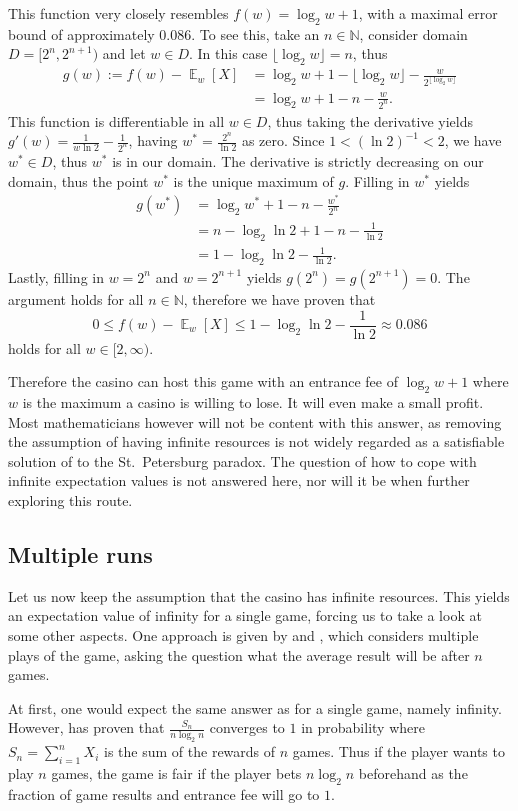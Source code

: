 \documentclass[twoside,a4paper]{article}
\theoremstyle{plain}
\theoremstyle{definition}
\theoremstyle{remark}
\numberwithin{equation}{section}
\newcommand{\N}{\mathbb{N}}
\DeclareMathOperator{\E}{\mathbb{E}}
\DeclareMathOperator{\1}{\mathbbm{1}}
\begin{document}
This function very closely resembles $f(w)=\log_2 w+1$, with a maximal error bound of approximately $0.086$. To see this, take an $n\in\N$, consider domain $D=[2^n,2^{n+1})$ and let $w\in D$. In this case $\lfloor\log_2 w\rfloor=n$, thus
\begin{align*}
g(w):=f(w)-\E_w[X]&=\log_2 w+1-\lfloor\log_2 w\rfloor-\frac{w}{2^{\lfloor\log_2 w\rfloor}}\\
&=\log_2 w+1-n-\frac{w}{2^n}.
\end{align*}
This function is differentiable in all $w\in D$, thus taking the derivative yields $g'(w)=\frac{1}{w\ln2}-\frac{1}{2^n}$, having $w^*=\frac{2^n}{\ln2}$ as zero. Since $1<(\ln2)^{-1}<2$, we have $w^*\in D$, thus $w^*$ is in our domain. The derivative is strictly decreasing on our domain, thus the point $w^*$ is the unique maximum of $g$. Filling in $w^*$ yields
\begin{align*}
g(w^*)&=\log_2 w^*+1-n-\frac{w^*}{2^n}\\
&=n-\log_2\ln 2+1-n-\frac{1}{\ln2}\\
&=1-\log_2\ln2-\frac{1}{\ln2}.
\end{align*}
Lastly, filling in $w=2^n$ and $w=2^{n+1}$ yields $g(2^n)=g(2^{n+1})=0$.
The argument holds for all $n\in\N$, therefore we have proven that
\[0\leq f(w)-\E_w[X]\leq1-\log_2\ln2-\frac{1}{\ln2}\approx0.086\]
holds for all $w\in[2,\infty)$.

Therefore the casino can host this game with an entrance fee of $\log_2 w+1$ where $w$ is the maximum a casino is willing to lose. It will even make a small profit. Most mathematicians however will not be content with this answer, as removing the assumption of having infinite resources is not widely regarded as a satisfiable solution of to the St.~Petersburg paradox. The question of how to cope with infinite expectation values is not answered here, nor will it be when further exploring this route.

\subsection{Multiple runs}
Let us now keep the assumption that the casino has infinite resources. This yields an expectation value of infinity for a single game, forcing us to take a look at some other aspects. One approach is given by \cite{Feller50} and \cite{Feller71}, which considers multiple plays of the game, asking the question what the average result will be after $n$ games.

At first, one would expect the same answer as for a single game, namely infinity. However, \cite{Feller50} has proven that $\frac{S_n}{n\log_2 n}$ converges to $1$ in probability where $S_n=\sum_{i=1}^n X_i$ is the sum of the rewards of $n$ games. Thus if the player wants to play $n$ games, the game is fair if the player bets $n\log_2 n$ beforehand as the fraction of game results and entrance fee will go to $1$.
\end{document}
